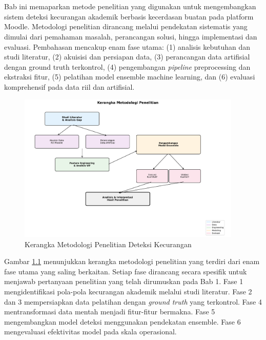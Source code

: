 \chapter{\babTiga}
\label{bab:3}
Bab ini memaparkan metode penelitian yang digunakan untuk mengembangkan sistem deteksi kecurangan akademik berbasis kecerdasan buatan pada platform Moodle. Metodologi penelitian dirancang melalui pendekatan sistematis yang dimulai dari pemahaman masalah, perancangan solusi, hingga implementasi dan evaluasi. Pembahasan mencakup enam fase utama: (1) analisis kebutuhan dan studi literatur, (2) akuisisi dan persiapan data, (3) perancangan data artifisial dengan ground truth terkontrol, (4) pengembangan \textit{pipeline} preprocessing dan ekstraksi fitur, (5) pelatihan model ensemble machine learning, dan (6) evaluasi komprehensif pada data riil dan artifisial.

\begin{figure}[htbp]
    \centering
    \includegraphics[width=0.95\textwidth]{newfigures/research_methodology_stages.pdf}
    \caption{Kerangka Metodologi Penelitian Deteksi Kecurangan}
    \label{fig:research_stages}
\end{figure}

Gambar \ref{fig:research_stages} menunjukkan kerangka metodologi penelitian yang terdiri dari enam fase utama yang saling berkaitan. Setiap fase dirancang secara spesifik untuk menjawab pertanyaan penelitian yang telah dirumuskan pada Bab 1. Fase 1 mengidentifikasi pola-pola kecurangan akademik melalui studi literatur. Fase 2 dan 3 mempersiapkan data pelatihan dengan \textit{ground truth} yang terkontrol. Fase 4 mentransformasi data mentah menjadi fitur-fitur bermakna. Fase 5 mengembangkan model deteksi menggunakan pendekatan ensemble. Fase 6 mengevaluasi efektivitas model pada skala operasional.


